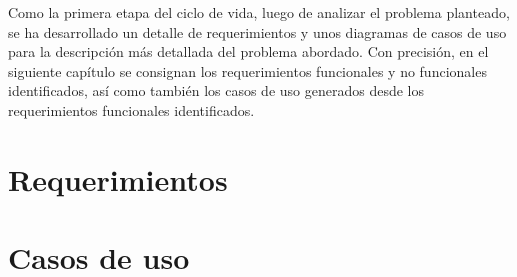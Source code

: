 Como la primera etapa del ciclo de vida, luego de analizar el problema planteado, se ha desarrollado un detalle de requerimientos y unos diagramas de casos de uso para la descripción más detallada del problema abordado. Con precisión, en el siguiente capítulo se consignan los requerimientos funcionales y no funcionales identificados, así como también los casos de uso generados desde los requerimientos funcionales identificados.

\section{Requerimientos}


\section{Casos de uso}
%